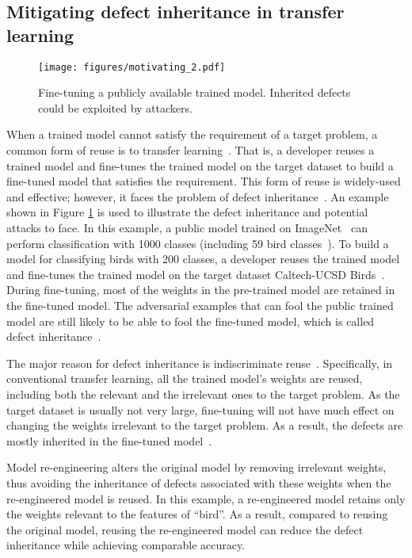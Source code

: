 \subsection{Mitigating defect inheritance in transfer learning}

\begin{figure}[t]
    \centering
    \texttt{[image: figures/motivating\_2.pdf]}
    \caption{Fine-tuning a publicly available trained model. Inherited defects could be exploited by 
    attackers. }
    \label{fig:motivation_2}
\end{figure}

When a trained model cannot satisfy the requirement of a target problem, a common form of reuse is to transfer learning~\cite{transfer1,transfer2,transfer3}.
That is, a developer reuses a trained model and fine-tunes the trained model on the target dataset to build a fine-tuned model that satisfies the requirement.
This form of reuse is widely-used and effective; however, it faces the problem of defect inheritance~\cite{ReMos,defect1,defect2,defect3}.
An example shown in Figure \ref{fig:motivation_2} is used to illustrate the defect inheritance and potential attacks to face.
In this example, a public model trained on ImageNet~\cite{imagenet} can perform classification with 1000 classes (including 59 bird classes~\cite{van2015building}).
To build a model for classifying birds with 200 classes, a developer reuses the trained model and fine-tunes the trained model on the target dataset Caltech-UCSD Birds~\cite{tfdata_birds}.
During fine-tuning, most of the weights in the pre-trained model are retained in the fine-tuned model.
The adversarial examples that can fool the public trained model are still likely to be able to fool the fine-tuned model, which is called defect inheritance~\cite{ReMos,defect1,defect2,defect3}.


The major reason for defect inheritance is indiscriminate reuse~\cite{rezaei2019target, ReMos}.
Specifically, in conventional transfer learning, all the trained model's weights are reused, including both the relevant and the irrelevant ones to the target problem.
As the target dataset is usually not very large, fine-tuning will not have much effect on changing the weights irrelevant to the target problem. As a result, 
the defects %
are mostly inherited in the fine-tuned model~\cite{liu2019wealthadapt, ReMos}.%

Model re-engineering alters the original model by removing irrelevant weights, thus avoiding the inheritance of defects associated with these weights when the re-engineered model is reused.
In this example, a re-engineered model retains only the weights relevant to the features of ``bird''.
As a result, compared to reusing the original model, reusing the re-engineered model can reduce the defect inheritance while achieving comparable accuracy.

